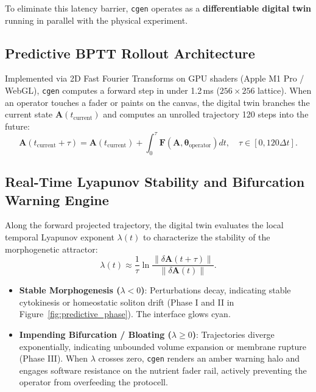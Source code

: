 \documentclass{article}
\begin{document}
To eliminate this latency barrier, \texttt{cgen} operates as a \textbf{differentiable digital twin} running in parallel with the physical experiment.

\subsection{Predictive BPTT Rollout Architecture}

Implemented via 2D Fast Fourier Transforms on GPU shaders (Apple M1 Pro / WebGL), \texttt{cgen} computes a forward step in under 1.2\,ms ($256 \times 256$ lattice). When an operator touches a fader or paints on the canvas, the digital twin branches the current state $\mathbf{A}(t_{\text{current}})$ and computes an unrolled trajectory 120 steps into the future:
\begin{equation}
\mathbf{A}(t_{\text{current}} + \tau) = \mathbf{A}(t_{\text{current}}) + \int_{0}^{\tau} \mathbf{F}(\mathbf{A}, \boldsymbol{\theta}_{\text{operator}}) dt, \quad \tau \in [0, 120\Delta t].
\label{eq:bptt_unroll}
\end{equation}

\subsection{Real-Time Lyapunov Stability and Bifurcation Warning Engine}

Along the forward projected trajectory, the digital twin evaluates the local temporal Lyapunov exponent $\lambda(t)$ to characterize the stability of the morphogenetic attractor:
\begin{equation}
\lambda(t) \approx \frac{1}{\tau} \ln \frac{\|\delta \mathbf{A}(t + \tau)\|}{\|\delta \mathbf{A}(t)\|}.
\label{eq:lyapunov}
\end{equation}
\begin{itemize}
    \item \textbf{Stable Morphogenesis ($\lambda < 0$)}: Perturbations decay, indicating stable cytokinesis or homeostatic soliton drift (Phase I and II in Figure~\ref{fig:predictive_phase}). The interface glows cyan.
    \item \textbf{Impending Bifurcation / Bloating ($\lambda \ge 0$)}: Trajectories diverge exponentially, indicating unbounded volume expansion or membrane rupture (Phase III). When $\lambda$ crosses zero, \texttt{cgen} renders an amber warning halo and engages software resistance on the nutrient fader rail, actively preventing the operator from overfeeding the protocell.
\end{itemize}
\end{document}
